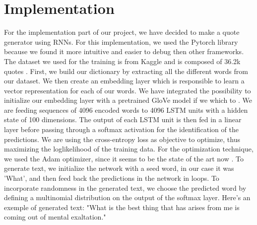 


\section{Implementation}
For the implementation part of our project, we have decided to make a quote
generator using RNNs. For this implementation, we used the Pytorch library
because we found it more intuitive and easier to debug then other frameworks.
The dataset we used for the training is from Kaggle and is composed of 36.2k
quotes \cite{quote}. First, we build our dictionary by extracting all the
different words from our dataset. We then create an embedding layer which is
responsible to learn a vector representation for each of our words. We have
integrated the possibility to initialize our embedding layer with a pretrained
GloVe model if we which to \cite{glove}. We are feeding sequences of 4096
encoded words to 4096 LSTM units with a hidden state of 100 dimensions. The
output of each LSTM unit is then fed in a linear layer before passing through a
softmax activation for the identification of the predictions. We are using the
cross-entropy loss as objective to optimize, thus maximizing the loglikelihood
of the training data. For the optimization technique, we used the Adam
optimizer, since it seems to be the state of the art now \cite{adam}. To
generate text, we initialize the network with a seed word, in our case it was
'What', and then feed back the predictions in the network in loops. To
incorporate randomness in the generated text, we choose the predicted word by
defining a multinomial distribution on the output of the softmax layer. Here's
an exemple of generated text: "What is the best thing that has arises from me
is coming out of mental exaltation."    

\clearpage

 

